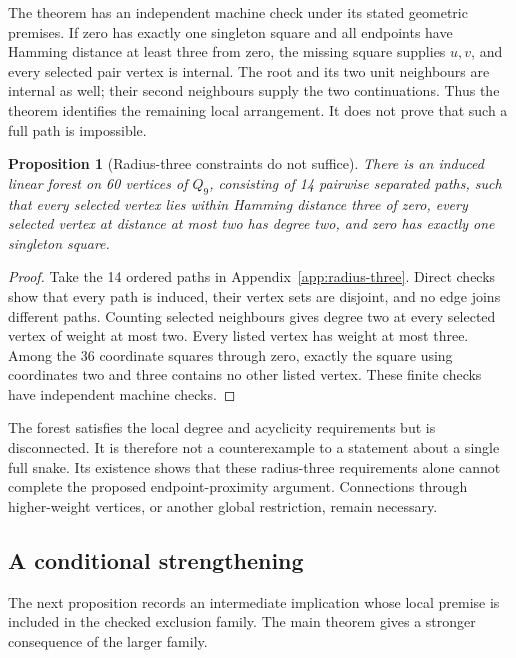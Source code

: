 \documentclass[11pt,a4paper]{article}
\newtheorem{proposition}[theorem]{Proposition}
\theoremstyle{definition}
\theoremstyle{remark}
\newcommand{\Q}{Q}
\begin{document}
The theorem has an independent machine check under its stated geometric premises. If zero has exactly one singleton square and all endpoints have Hamming distance at least three from zero, the missing square supplies $u,v$, and every selected pair vertex is internal. The root and its two unit neighbours are internal as well; their second neighbours supply the two continuations. Thus the theorem identifies the remaining local arrangement. It does not prove that such a full path is impossible.

\begin{proposition}[Radius-three constraints do not suffice]\label{prop:radius-three}
There is an induced linear forest on 60 vertices of $\Q_9$, consisting of 14 pairwise separated paths, such that every selected vertex lies within Hamming distance three of zero, every selected vertex at distance at most two has degree two, and zero has exactly one singleton square.
\end{proposition}
\begin{proof}
Take the 14 ordered paths in Appendix~\ref{app:radius-three}. Direct checks show that every path is induced, their vertex sets are disjoint, and no edge joins different paths. Counting selected neighbours gives degree two at every selected vertex of weight at most two. Every listed vertex has weight at most three. Among the 36 coordinate squares through zero, exactly the square using coordinates two and three contains no other listed vertex. These finite checks have independent machine checks.
\end{proof}

The forest satisfies the local degree and acyclicity requirements but is disconnected. It is therefore not a counterexample to a statement about a single full snake. Its existence shows that these radius-three requirements alone cannot complete the proposed endpoint-proximity argument. Connections through higher-weight vertices, or another global restriction, remain necessary.

\subsection{A conditional strengthening}
The next proposition records an intermediate implication whose local premise is included in the checked exclusion family. The main theorem gives a stronger consequence of the larger family.
\end{document}
